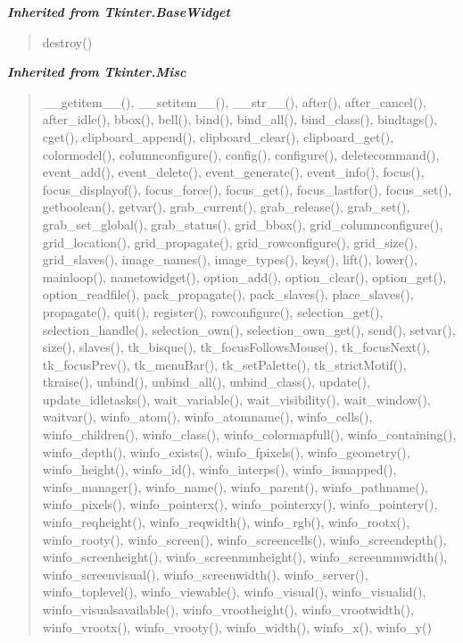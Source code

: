 \large{\textbf{\textit{Inherited from Tkinter.BaseWidget}}}

\begin{quote}
destroy()
\end{quote}

\large{\textbf{\textit{Inherited from Tkinter.Misc}}}

\begin{quote}
\_\_getitem\_\_(), \_\_setitem\_\_(), \_\_str\_\_(), after(), after\_cancel(), after\_idle(), bbox(), bell(), bind(), bind\_all(), bind\_class(), bindtags(), cget(), clipboard\_append(), clipboard\_clear(), clipboard\_get(), colormodel(), columnconfigure(), config(), configure(), deletecommand(), event\_add(), event\_delete(), event\_generate(), event\_info(), focus(), focus\_displayof(), focus\_force(), focus\_get(), focus\_lastfor(), focus\_set(), getboolean(), getvar(), grab\_current(), grab\_release(), grab\_set(), grab\_set\_global(), grab\_status(), grid\_bbox(), grid\_columnconfigure(), grid\_location(), grid\_propagate(), grid\_rowconfigure(), grid\_size(), grid\_slaves(), image\_names(), image\_types(), keys(), lift(), lower(), mainloop(), nametowidget(), option\_add(), option\_clear(), option\_get(), option\_readfile(), pack\_propagate(), pack\_slaves(), place\_slaves(), propagate(), quit(), register(), rowconfigure(), selection\_get(), selection\_handle(), selection\_own(), selection\_own\_get(), send(), setvar(), size(), slaves(), tk\_bisque(), tk\_focusFollowsMouse(), tk\_focusNext(), tk\_focusPrev(), tk\_menuBar(), tk\_setPalette(), tk\_strictMotif(), tkraise(), unbind(), unbind\_all(), unbind\_class(), update(), update\_idletasks(), wait\_variable(), wait\_visibility(), wait\_window(), waitvar(), winfo\_atom(), winfo\_atomname(), winfo\_cells(), winfo\_children(), winfo\_class(), winfo\_colormapfull(), winfo\_containing(), winfo\_depth(), winfo\_exists(), winfo\_fpixels(), winfo\_geometry(), winfo\_height(), winfo\_id(), winfo\_interps(), winfo\_ismapped(), winfo\_manager(), winfo\_name(), winfo\_parent(), winfo\_pathname(), winfo\_pixels(), winfo\_pointerx(), winfo\_pointerxy(), winfo\_pointery(), winfo\_reqheight(), winfo\_reqwidth(), winfo\_rgb(), winfo\_rootx(), winfo\_rooty(), winfo\_screen(), winfo\_screencells(), winfo\_screendepth(), winfo\_screenheight(), winfo\_screenmmheight(), winfo\_screenmmwidth(), winfo\_screenvisual(), winfo\_screenwidth(), winfo\_server(), winfo\_toplevel(), winfo\_viewable(), winfo\_visual(), winfo\_visualid(), winfo\_visualsavailable(), winfo\_vrootheight(), winfo\_vrootwidth(), winfo\_vrootx(), winfo\_vrooty(), winfo\_width(), winfo\_x(), winfo\_y()
\end{quote}

